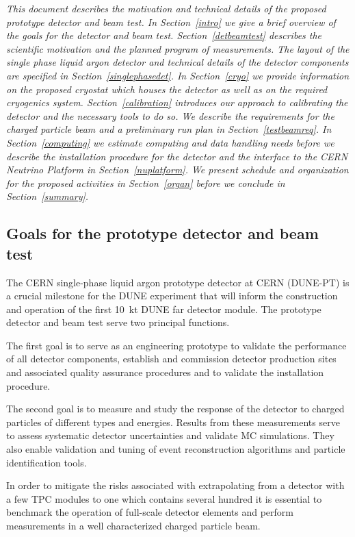 
{\it 
This document describes the motivation and technical details of the proposed prototype detector and beam test. 
In Section~\ref{intro} we give a brief overview of the goals for the detector and beam test.
Section~\ref{detbeamtest} describes the scientific motivation and the planned program of measurements. The layout of the single phase liquid argon detector and technical details of the detector components are specified in Section~\ref{singlephasedet}. In Section~\ref{cryo} we provide information on the proposed cryostat which houses the detector as well as on the required cryogenics system. Section~\ref{calibration} introduces our approach to calibrating the detector and the necessary tools to do so. We describe the requirements for the charged particle beam and a preliminary run plan in Section~\ref{testbeamreq}.
In Section~\ref{computing} we estimate computing and data handling needs before we describe the installation procedure for the detector
and the interface to the CERN Neutrino Platform in Section~\ref{nuplatform}. We present schedule and organization for the proposed activities in Section~\ref{organ} before we conclude in Section~\ref{summary}.}

\label{intro}


\subsection{Goals for the prototype detector and beam test}

The CERN single-phase liquid argon prototype detector at CERN (DUNE-PT) is a crucial milestone for the DUNE experiment that will inform the construction and operation of the first 10~kt DUNE far detector module.  The prototype detector and beam test serve two principal functions. 

The first goal is 
to serve as an engineering prototype to validate the performance of all detector components,
establish and commission detector production sites and associated quality assurance procedures and to validate the installation procedure. 


The second goal is 
to measure and study the response of the detector to charged particles of different types and energies. 
Results from these measurements serve to assess systematic detector uncertainties and
validate MC simulations. They also enable validation and tuning of event reconstruction algorithms and particle identification tools.

%
In order to mitigate the risks associated with extrapolating 
from a detector with a few TPC modules to one which contains several hundred 
 it is essential to benchmark the operation of full-scale detector elements
and perform measurements in a well characterized charged particle beam.  

